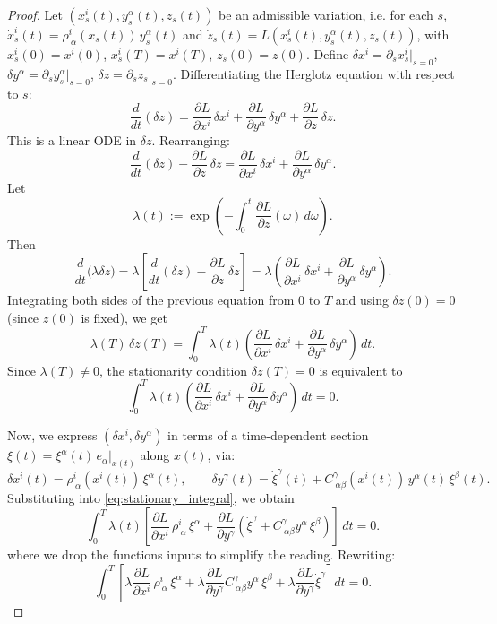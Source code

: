 \documentclass[11pt,a4paper]{article}
\theoremstyle{definition}
\begin{document}
\begin{proof}
Let $(x^{i}_s(t),y^{\alpha}_s(t),z_s(t))$ be an admissible variation, i.e.
for each $s$, $\dot x_s^i(t) = \rho^i_{\ \alpha}(x_s(t))\,y_s^\alpha(t)$ and $
\dot z_s(t) = L(x^{i}_s(t),y^{\alpha}_s(t),z_s(t))$, with $x^{i}_s(0)=x^{i}(0)$, $x^{i}_s(T)=x^{i}(T)$, $z_s(0)=z(0)$.
Define $\delta x^i = \partial_s x_s^i|_{s=0}$, 
$\delta y^\alpha=\partial_s y_s^\alpha|_{s=0}$, 
$\delta z = \partial_s z_s|_{s=0}$. Differentiating the Herglotz equation with respect to $s$:
\[
\frac{d}{dt}(\delta z)
= \frac{\partial L}{\partial x^i}\,\delta x^i
+ \frac{\partial L}{\partial y^\alpha}\,\delta y^\alpha
+ \frac{\partial L}{\partial z}\,\delta z.
\]
This is a linear ODE in $\delta z$. Rearranging:
\[
\frac{d}{dt}(\delta z) - \frac{\partial L}{\partial z}\,\delta z
= \frac{\partial L}{\partial x^i}\,\delta x^i
+ \frac{\partial L}{\partial y^\alpha}\,\delta y^\alpha.
\]
Let
\[
\lambda(t) := \exp\!\left(-\int_0^t \frac{\partial L}{\partial z}(\omega)\,d\omega\right).
\]
Then
\[
\frac{d}{dt} \big(\lambda \delta z\big)
= \lambda \left[\frac{d}{dt}(\delta z) - \frac{\partial L}{\partial z}\,\delta z\right]
= \lambda \left(
\frac{\partial L}{\partial x^i}\,\delta x^i
+ \frac{\partial L}{\partial y^\alpha}\,\delta y^\alpha
\right).
\]
Integrating both sides of the previous equation from $0$ to $T$ and using $\delta z(0)=0$ (since $z(0)$ is fixed),
we get
\[
\lambda(T)\,\delta z(T)
= \int_0^T \lambda(t)
\left(
\frac{\partial L}{\partial x^i}\,\delta x^i
+ \frac{\partial L}{\partial y^\alpha}\,\delta y^\alpha
\right) \,dt.
\]
Since $\lambda(T)\neq 0$, the stationarity condition 
$\delta z(T)=0$ is equivalent to
\begin{equation}\label{eq:stationary_integral}
\int_0^T \lambda(t)
\left(
\frac{\partial L}{\partial x^i}\,\delta x^i
+ \frac{\partial L}{\partial y^\alpha}\,\delta y^\alpha
\right) \,dt = 0.
\end{equation}

Now, we express $(\delta x^{i},\delta y^{\alpha})$ in terms of a time-dependent
section $\xi(t) = \xi^\alpha(t)\,e_\alpha|_{x(t)}$ along $x(t)$, via:
\[
\delta x^i(t) = \rho^i_{\ \alpha}(x^{i}(t))\,\xi^\alpha(t),
\qquad
\delta y^\gamma (t)= \dot \xi^\gamma (t) + C^\gamma_{\ \alpha\beta}(x^{i}(t))\,y^\alpha (t) \,\xi^\beta (t).
\]
Substituting into \eqref{eq:stationary_integral}, we obtain
\[
\int_0^T \lambda(t)
\left[
\frac{\partial L}{\partial x^i}\,\rho^i_{\ \alpha}\,\xi^\alpha
+ \frac{\partial L}{\partial y^\gamma}
\left(
\dot \xi^\gamma + C^\gamma_{\ \alpha\beta}y^\alpha\,\xi^\beta
\right)
\right] \,dt = 0.
\]
where we drop the functions inputs to simplify the reading. Rewriting:
\[
\int_0^T \left[
\lambda \frac{\partial L}{\partial x^i}\,\rho^i_{\ \alpha}\,\xi^\alpha
+ \lambda \frac{\partial L}{\partial y^\gamma} C^\gamma_{\ \alpha\beta}y^\alpha\,\xi^\beta
+ \lambda \frac{\partial L}{\partial y^\gamma} \dot \xi^\gamma
\right] dt = 0.
\]


\end{proof}
\end{document}
